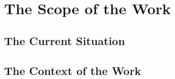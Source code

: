 \chapter{The Scope of the Work}

\section{The Current Situation}

\section{The Context of the Work}
